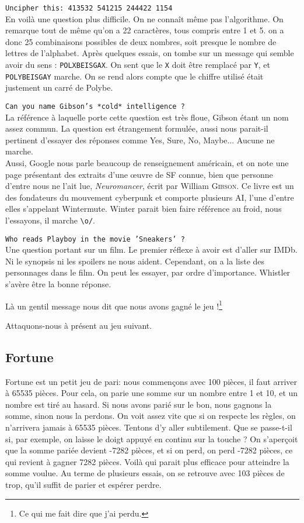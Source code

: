 \documentclass[11pt]{article}
\newcommand{\ttt}[1]{\texttt{#1}}
\begin{document}
   \ttt{Uncipher this: 413532 541215 244422 1154}\\
   En voilà une question plus difficile. On ne connaît même pas l'algorithme. On remarque tout de même qu'on a 22 caractères, tous compris entre 1 et 5. on a donc 25 combinaisons possibles de deux nombres, soit presque le nombre de lettres de l'alphabet. Après quelques essais, on tombe sur un message qui semble avoir du sens : \ttt{POLXBEISGAX}. On sent que le \ttt{X} doit être remplacé par \ttt{Y}, et \ttt{POLYBEISGAY} marche. On se rend alors compte que le chiffre utilisé était justement un carré de Polybe.

   \ttt{Can you name Gibson's *cold* intelligence ?}\\
   La référence à laquelle porte cette question est très floue, Gibson étant un nom assez commun. La question est étrangement formulée, aussi nous parait-il pertinent d'essayer des réponses comme \og Yes\fg , \og Sure\fg , \og No\fg , \og Maybe\fg ... Aucune ne marche.\\
   Aussi, Google nous parle beaucoup de renseignement américain, et on note une page présentant des extraits d'une \oe{}uvre de SF connue, bien que personne d'entre nous ne l'ait lue, \emph{Neuromancer}, écrit par William \textsc{Gibson}. Ce livre est un des fondateurs du mouvement cyberpunk et comporte plusieurs AI, l'une d'entre elles s'appelant Wintermute. Winter parait bien faire référence au froid, nous l'essayons, il marche \verb|\o/|.

   \ttt{Who reads Playboy in the movie 'Sneakers' ?}\\
   Une question portant sur un film. Le premier réflexe à avoir est d'aller sur IMDb. Ni le synopsis ni les spoilers ne nous aident. Cependant, on a la liste des personnages dans le film. On peut les essayer, par ordre d'importance. \og Whistler \fg{} s'avère être la bonne réponse.

   Là un gentil message nous dit que nous avons gagné le jeu !\footnote{Ce qui me fait dire que j'ai perdu.}

    Attaquons-nous à présent au jeu suivant.
    \subsection{Fortune}
    Fortune est un petit jeu de pari: nous commençons avec 100 pièces, il faut arriver à 65535 pièces. Pour cela, on parie une somme sur un nombre entre 1 et 10, et un nombre est tiré au hasard. Si nous avons parié sur le bon, nous gagnons la somme, sinon nous la perdons. On voit assez vite que si on respecte les règles, on n'arrivera jamais à 65535 pièces. Tentons d'y aller subtilement. Que se passe-t-il si, par exemple, on laisse le doigt appuyé en continu sur la touche  \fg  ? On s'aperçoit que la somme pariée devient -7282 pièces, et si on perd, on perd -7282 pièces, ce qui revient à gagner 7282 pièces. Voilà qui parait plus efficace pour atteindre la somme voulue. Au terme de plusieurs essais, on se retrouve avec 103 pièces de trop, qu'il suffit de parier et espérer perdre.
\end{document}
